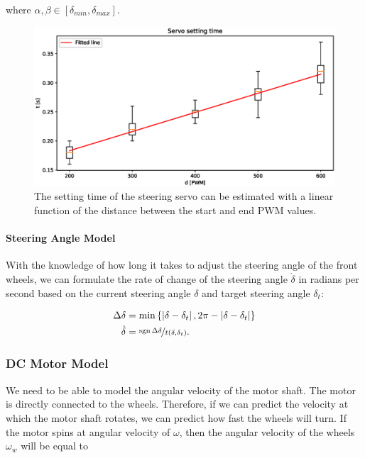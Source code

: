 where $\alpha,\beta\in\left[\delta_{min}, \delta_{max}\right]$.

\begin{figure}
	\includegraphics[width=\textwidth]{../img/servo_setting_time_linreg.eps}
	\caption{The setting time of the steering servo can be estimated with a linear function of the distance between the start and end PWM values.}
	\label{fig:servo_linear_regression}
\end{figure}

\paragraph{Steering Angle Model}

With the knowledge of how long it takes to adjust the steering angle of the front wheels, we can formulate the rate of change of the steering angle $\dot{\delta}$ in radians per second based on the current steering angle $\delta$ and target steering angle $\delta_t$:

\begin{equation}
\begin{aligned}
\Delta \delta&=\min\left\{\left|{\delta-\delta_t}\right|, 2\pi-\left|{\delta-\delta_t}\right|\right\}\\
\dot{\delta}&=\nicefrac{\operatorname{sgn}{} \Delta \delta}{t(\delta, \delta_t)}.
\end{aligned}
\end{equation}

\subsubsection{DC Motor Model}

We need to be able to model the angular velocity of the motor shaft. The motor is directly connected to the wheels. Therefore, if we can predict the velocity at which the motor shaft rotates, we can predict how fast the wheels will turn. If the motor spins at angular velocity of $\omega$, then the angular velocity of the wheels $\omega_w$ will be equal to

